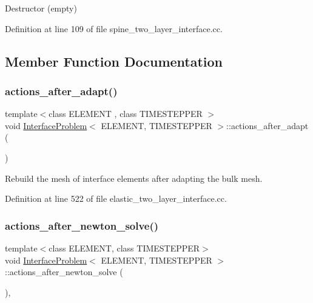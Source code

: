 Destructor (empty) 



Definition at line 109 of file spine\+\_\+two\+\_\+layer\+\_\+interface.\+cc.



\subsection{Member Function Documentation}
\mbox{\label{classInterfaceProblem_a1c8a5dee970dccc3f1da993cf531872d}} 
\subsubsection{\texorpdfstring{actions\+\_\+after\+\_\+adapt()}{actions\_after\_adapt()}}
{\footnotesize\ttfamily template$<$class E\+L\+E\+M\+E\+NT , class T\+I\+M\+E\+S\+T\+E\+P\+P\+ER $>$ \\
void \hyperlink{classInterfaceProblem}{Interface\+Problem}$<$ E\+L\+E\+M\+E\+NT, T\+I\+M\+E\+S\+T\+E\+P\+P\+ER $>$\+::actions\+\_\+after\+\_\+adapt (\begin{DoxyParamCaption}{ }\end{DoxyParamCaption})\hspace{0.3cm}{\ttfamily [private]}}



Rebuild the mesh of interface elements after adapting the bulk mesh. 



Definition at line 522 of file elastic\+\_\+two\+\_\+layer\+\_\+interface.\+cc.

\mbox{\label{classInterfaceProblem_aedc2e58b3d2f5f8c898a21ba2d245cee}} 
\subsubsection{\texorpdfstring{actions\+\_\+after\+\_\+newton\+\_\+solve()}{actions\_after\_newton\_solve()}\hspace{0.1cm}{\footnotesize\ttfamily [1/2]}}
{\footnotesize\ttfamily template$<$class E\+L\+E\+M\+E\+NT, class T\+I\+M\+E\+S\+T\+E\+P\+P\+ER$>$ \\
void \hyperlink{classInterfaceProblem}{Interface\+Problem}$<$ E\+L\+E\+M\+E\+NT, T\+I\+M\+E\+S\+T\+E\+P\+P\+ER $>$\+::actions\+\_\+after\+\_\+newton\+\_\+solve (\begin{DoxyParamCaption}{ }\end{DoxyParamCaption})\hspace{0.3cm}{\ttfamily [inline]}, {\ttfamily [private]}}




